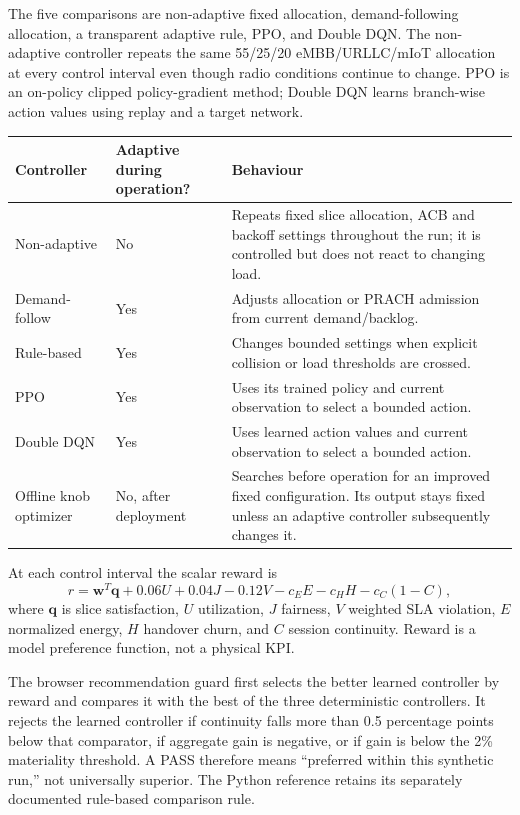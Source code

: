 \documentclass[10pt]{article}
\begin{document}
The five comparisons are non-adaptive fixed allocation, demand-following allocation, a transparent adaptive rule, PPO, and Double DQN. The non-adaptive controller repeats the same 55/25/20 eMBB/URLLC/mIoT allocation at every control interval even though radio conditions continue to change. PPO is an on-policy clipped policy-gradient method; Double DQN learns branch-wise action values using replay and a target network.

\begin{tabular}{>{\raggedright\arraybackslash}p{}>{\raggedright\arraybackslash}p{}>{\raggedright\arraybackslash}p{}}
\toprule
Controller & Adaptive during operation? & Behaviour\\
\midrule
Non-adaptive & No & Repeats fixed slice allocation, ACB and backoff settings throughout the run; it is controlled but does not react to changing load.\\
Demand-follow & Yes & Adjusts allocation or PRACH admission from current demand/backlog.\\
Rule-based & Yes & Changes bounded settings when explicit collision or load thresholds are crossed.\\
PPO & Yes & Uses its trained policy and current observation to select a bounded action.\\
Double DQN & Yes & Uses learned action values and current observation to select a bounded action.\\
Offline knob optimizer & No, after deployment & Searches before operation for an improved fixed configuration. Its output stays fixed unless an adaptive controller subsequently changes it.\\
\bottomrule
\end{tabular}

At each control interval the scalar reward is
\[
r=\mathbf{w}^{T}\mathbf{q}+0.06U+0.04J-0.12V
-c_EE-c_HH-c_C(1-C),
\]
where $\mathbf q$ is slice satisfaction, $U$ utilization, $J$ fairness, $V$ weighted SLA violation, $E$ normalized energy, $H$ handover churn, and $C$ session continuity. Reward is a model preference function, not a physical KPI.

The browser recommendation guard first selects the better learned controller by reward and compares it with the best of the three deterministic controllers. It rejects the learned controller if continuity falls more than 0.5 percentage points below that comparator, if aggregate gain is negative, or if gain is below the 2\% materiality threshold. A PASS therefore means ``preferred within this synthetic run,'' not universally superior. The Python reference retains its separately documented rule-based comparison rule.
\end{document}
